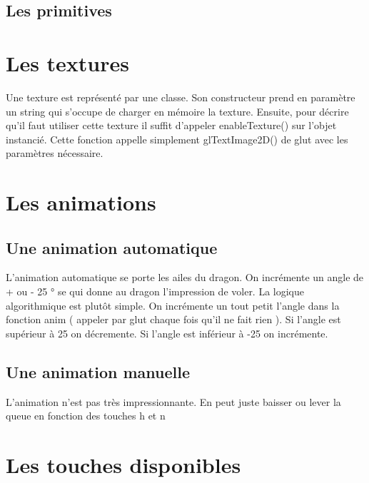 \documentclass{article}
\begin{document}
\subsection{Les primitives}


\section{Les textures}

Une texture est représenté par une classe. Son constructeur prend en paramètre un string qui s'occupe de charger en mémoire la texture. Ensuite, pour décrire qu'il faut utiliser cette texture il suffit d'appeler enableTexture() sur l'objet instancié. Cette fonction appelle simplement glTextImage2D() de glut avec les paramètres nécessaire.  


\section{Les animations}

\subsection{Une animation automatique}

L'animation automatique se porte les ailes du dragon. On incrémente un angle de + ou - 25 ° se qui donne au dragon l'impression de voler. La logique algorithmique est plutôt simple. On incrémente un tout petit l'angle dans la fonction anim ( appeler par glut chaque fois qu'il ne fait rien ). Si l'angle est supérieur à 25 on décremente. Si l'angle est inférieur à -25 on incrémente. 
 
\subsection{Une animation manuelle}

L'animation n'est pas très impressionnante. En peut juste baisser ou lever la queue en fonction des touches h et n


\section{Les touches disponibles}
\end{document}

